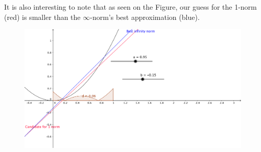 \begin{solution}
\begin{enumerate}
It is also interesting to note that as seen on the Figure, our guess for the 1-norm (red) is smaller than the $\infty$-norm's best approximation (blue).

    \begin{figure}[!ht]
      \centering
      \includegraphics[scale = 0.2]{task7.png}
      \label{fig:task_7}
    \end{figure}

\end{enumerate}
\end{solution}

 	

